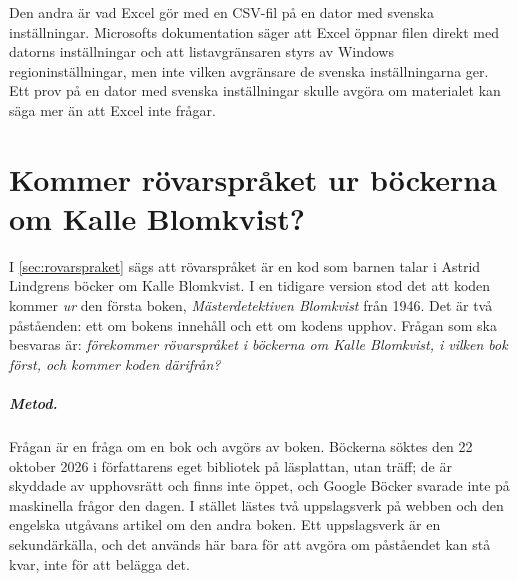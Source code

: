 Den andra är vad Excel gör med en CSV-fil på en dator med svenska
inställningar.  Microsofts dokumentation säger att Excel öppnar filen
direkt med datorns inställningar och att listavgränsaren styrs av
Windows regioninställningar\autocite{MicrosoftCSV}, men inte vilken
avgränsare de svenska inställningarna ger.  Ett prov på en dator med
svenska inställningar skulle avgöra om materialet kan säga mer än att
Excel inte frågar.


\chapter{Kommer rövarspråket ur böckerna om Kalle Blomkvist?}
\label{app:rovarspraket}

I \cref{sec:rovarspraket} sägs att rövarspråket är en kod som barnen
talar i Astrid Lindgrens böcker om Kalle Blomkvist.  I en tidigare
version stod det att koden kommer \emph{ur} den första boken,
\emph{Mästerdetektiven Blomkvist} från 1946.  Det är två påståenden: ett
om bokens innehåll och ett om kodens upphov.  Frågan som ska besvaras
är: \emph{förekommer rövarspråket i böckerna om Kalle Blomkvist, i
vilken bok först, och kommer koden därifrån?}

\paragraph{Metod.}  Frågan är en fråga om en bok och avgörs av boken.
Böckerna söktes den 22 oktober 2026 i författarens eget bibliotek på
läsplattan, utan träff; de är skyddade av upphovsrätt och finns inte
öppet, och Google Böcker svarade inte på maskinella frågor den dagen.  I
stället lästes två uppslagsverk på
webben\autocite{WikipediaRovarspraketSv,WikipediaRovarspraketEn} och den
engelska utgåvans artikel om den andra boken\autocite{WikipediaBillBergson1951}.
Ett uppslagsverk är en sekundärkälla, och det används här bara för att
avgöra om påståendet kan stå kvar, inte för att belägga det.


